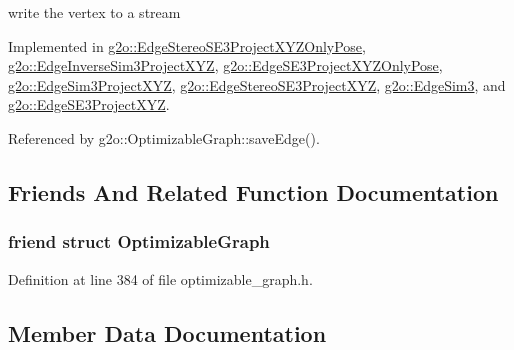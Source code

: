 write the vertex to a stream 



Implemented in \hyperlink{classg2o_1_1EdgeStereoSE3ProjectXYZOnlyPose_aa31f6c66016ec7f362ab3028a53e8cc6}{g2o\+::\+Edge\+Stereo\+S\+E3\+Project\+X\+Y\+Z\+Only\+Pose}, \hyperlink{classg2o_1_1EdgeInverseSim3ProjectXYZ_a9df647cceceabdecd26692647211e043}{g2o\+::\+Edge\+Inverse\+Sim3\+Project\+X\+YZ}, \hyperlink{classg2o_1_1EdgeSE3ProjectXYZOnlyPose_a5bf685170d6b17908b2a70ccc7e40904}{g2o\+::\+Edge\+S\+E3\+Project\+X\+Y\+Z\+Only\+Pose}, \hyperlink{classg2o_1_1EdgeSim3ProjectXYZ_ad29bc1412dd5141b9ff9b5bb7363db4c}{g2o\+::\+Edge\+Sim3\+Project\+X\+YZ}, \hyperlink{classg2o_1_1EdgeStereoSE3ProjectXYZ_acda965a32bd3aeb156cbd5883d19e864}{g2o\+::\+Edge\+Stereo\+S\+E3\+Project\+X\+YZ}, \hyperlink{classg2o_1_1EdgeSim3_a50f9e0b48bd9143eb516be36e0c25340}{g2o\+::\+Edge\+Sim3}, and \hyperlink{classg2o_1_1EdgeSE3ProjectXYZ_a3f09d0456f011dfa53b6f61b566e27fd}{g2o\+::\+Edge\+S\+E3\+Project\+X\+YZ}.



Referenced by g2o\+::\+Optimizable\+Graph\+::save\+Edge().



\subsection{Friends And Related Function Documentation}
\subsubsection[{\texorpdfstring{Optimizable\+Graph}{OptimizableGraph}}]{\setlength{\rightskip}{0pt plus 5cm}friend struct {\bf Optimizable\+Graph}\hspace{0.3cm}{\ttfamily [friend]}}\hypertarget{classg2o_1_1OptimizableGraph_1_1Edge_a45d35331ee3deca38c26d1efb6b961ae}{}\label{classg2o_1_1OptimizableGraph_1_1Edge_a45d35331ee3deca38c26d1efb6b961ae}


Definition at line 384 of file optimizable\+\_\+graph.\+h.



\subsection{Member Data Documentation}

